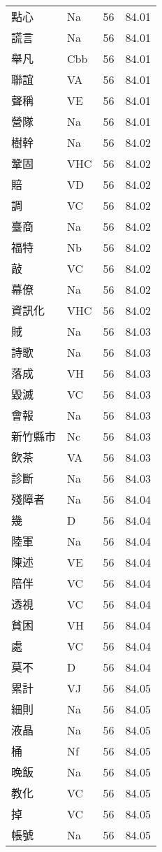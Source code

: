 \documentclass[twocolumn]{book}
\begin{document}
\begin{supertabular}{llrr}
點心 & Na & 56 &  84.01\\
謊言 & Na & 56 &  84.01\\
舉凡 & Cbb & 56 &  84.01\\
聯誼 & VA & 56 &  84.01\\
聲稱 & VE & 56 &  84.01\\
營隊 & Na & 56 &  84.01\\
樹幹 & Na & 56 &  84.02\\
鞏固 & VHC & 56 &  84.02\\
賠 & VD & 56 &  84.02\\
調 & VC & 56 &  84.02\\
臺商 & Na & 56 &  84.02\\
福特 & Nb & 56 &  84.02\\
敲 & VC & 56 &  84.02\\
幕僚 & Na & 56 &  84.02\\
資訊化 & VHC & 56 &  84.02\\
賊 & Na & 56 &  84.03\\
詩歌 & Na & 56 &  84.03\\
落成 & VH & 56 &  84.03\\
毀滅 & VC & 56 &  84.03\\
會報 & Na & 56 &  84.03\\
新竹縣市 & Nc & 56 &  84.03\\
飲茶 & VA & 56 &  84.03\\
診斷 & Na & 56 &  84.03\\
殘障者 & Na & 56 &  84.04\\
幾 & D & 56 &  84.04\\
陸軍 & Na & 56 &  84.04\\
陳述 & VE & 56 &  84.04\\
陪伴 & VC & 56 &  84.04\\
透視 & VC & 56 &  84.04\\
貧困 & VH & 56 &  84.04\\
處 & VC & 56 &  84.04\\
莫不 & D & 56 &  84.04\\
累計 & VJ & 56 &  84.05\\
細則 & Na & 56 &  84.05\\
液晶 & Na & 56 &  84.05\\
桶 & Nf & 56 &  84.05\\
晚飯 & Na & 56 &  84.05\\
教化 & VC & 56 &  84.05\\
掉 & VC & 56 &  84.05\\
帳號 & Na & 56 &  84.05\\

\end{supertabular}
\end{document}
